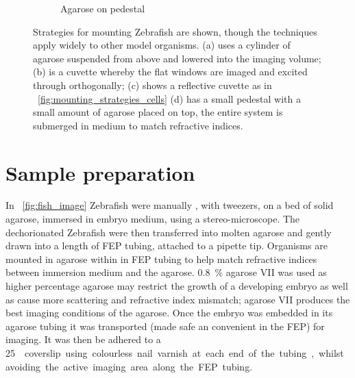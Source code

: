 \begin{figure}
\begin{subfigure}[b]{0.4\linewidth}
         \caption{Agarose on pedestal}
    \end{subfigure}
    \caption{Strategies for mounting Zebrafish are shown, though the techniques apply widely to other model organisms.
    (a) uses a cylinder of agarose suspended from above and lowered into the imaging volume;
    (b) is a cuvette whereby the flat windows are imaged and excited through orthogonally;
    (c) shows a reflective cuvette as in \figurename~\ref{fig:mounting_strategies_cells}
    (d) has a small pedestal with a small amount of agarose placed on top, the entire system is submerged in medium to match refractive indices.}
    \label{fig:mounting_strategies_fish_cartoon}
\end{figure}



\section{Sample preparation}

In \figurename~\ref{fig:fish_image} \gls{Zebrafish} were manually , with tweezers, on a bed of solid agarose, immersed in embryo medium, using a stereo-microscope.
The dechorionated Zebrafish were then transferred into molten agarose and gently drawn into a length of \gls{FEP} tubing, attached to a pipette tip.
Organisms are mounted in agarose within in \gls{FEP} tubing to help match refractive indices between immersion medium and the agarose.
\SI{0.8}{\percent} \gls{agarose VII} was used as higher percentage agarose may restrict the growth of a developing embryo as well as cause more scattering and refractive index mismatch; \gls{agarose VII} produces the best imaging conditions of the agarose\cite{4}.
Once the embryo was embedded in its agarose tubing it was transported (made safe an convenient in the \gls{FEP}) for imaging.
It was then be adhered to a \SI{25}{\milli\metre\square} coverslip using colourless nail varnish at each end of the tubing, whilst avoiding the active imaging area along the \gls{FEP} tubing.

